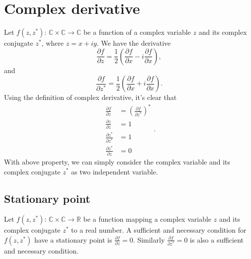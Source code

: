 \documentclass[revised,endfloat]{geophysics}
\begin{document}
\section{Complex derivative}
Let $f(z, z^{\ast})$: $\mathbb{C} \times \mathbb{C} \rightarrow \mathbb{C}$ be a function of a complex variable $z$ and its complex conjugate $z^{\ast}$, where $z = x + iy$. We have the derivative 
\begin{equation}
\frac{\partial f}{\partial z} = \frac{1}{2}(\frac{\partial f}{\partial x} - i\frac{\partial f}{\partial x}),
\end{equation}
and
\begin{equation}
\frac{\partial f}{\partial z^{\ast}} = \frac{1}{2}(\frac{\partial f}{\partial x} + i\frac{\partial f}{\partial x}).
\end{equation}
Using the definition of complex derivative, it's clear that 
\begin{equation}
\begin{split}
\frac{\partial f}{\partial z} &= \left( \frac{\partial f}{\partial z^{\ast}} \right)^{\ast} \\
\frac{\partial z}{\partial z} &= 1 \\
\frac{\partial z^{\ast}}{\partial z^{\ast}} &= 1 \\
\frac{\partial z^{\ast}}{\partial z} &= 0
\end{split}.
\end{equation}
With above property, we can simply consider the complex variable and its complex conjugate $z^{\ast}$ as two independent variable. 

\subsection{Stationary point}
Let $f(z, z^{\ast})$: $\mathbb{C} \times \mathbb{C} \rightarrow \mathbb{R}$ be a function mapping a complex variable $z$ and its complex conjugate $z^{\ast}$ to a real number. A sufficient and necessary condition for $f(z, z^{\ast})$ have a stationary point is $\frac{\partial f}{\partial z} = 0$. Similarly $\frac{\partial f}{\partial z^{\ast}} = 0$ is also a sufficient and necessary condition.
\end{document}
